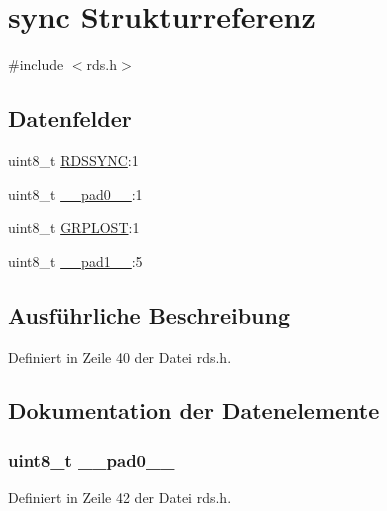 \hypertarget{structsync}{}\section{sync Strukturreferenz}
\label{structsync}


{\ttfamily \#include $<$rds.\+h$>$}

\subsection*{Datenfelder}
\begin{DoxyCompactItemize}
\item 
uint8\+\_\+t \hyperlink{structsync_acdf4253982980384be3340fd9a9ab7c5}{R\+D\+S\+S\+Y\+N\+C}\+:1
\item 
uint8\+\_\+t \hyperlink{structsync_a8b4eebe79ded0459acec2f4950102ba3}{\+\_\+\+\_\+pad0\+\_\+\+\_\+}\+:1
\item 
uint8\+\_\+t \hyperlink{structsync_a430b332cff3a3786c4854defcd95d078}{G\+R\+P\+L\+O\+S\+T}\+:1
\item 
uint8\+\_\+t \hyperlink{structsync_a77f12d2e278bd5c07712648ac0df5e08}{\+\_\+\+\_\+pad1\+\_\+\+\_\+}\+:5
\end{DoxyCompactItemize}


\subsection{Ausführliche Beschreibung}


Definiert in Zeile 40 der Datei rds.\+h.



\subsection{Dokumentation der Datenelemente}
\hypertarget{structsync_a8b4eebe79ded0459acec2f4950102ba3}{}
\subsubsection[{\+\_\+\+\_\+pad0\+\_\+\+\_\+}]{\setlength{\rightskip}{0pt plus 5cm}uint8\+\_\+t \+\_\+\+\_\+pad0\+\_\+\+\_\+}\label{structsync_a8b4eebe79ded0459acec2f4950102ba3}


Definiert in Zeile 42 der Datei rds.\+h.

\hypertarget{structsync_a77f12d2e278bd5c07712648ac0df5e08}{}
